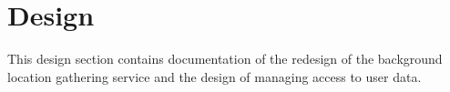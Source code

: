 \section{Design}
\label{sec:aSTEPCommunication}
This design section contains documentation of the redesign of the background location gathering service and the design of managing access to user data.




